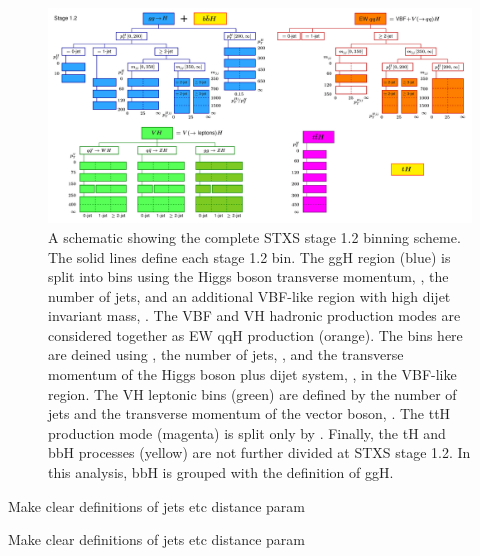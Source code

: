 \begin{landscape}
\begin{figure}[htbp]
  \centering
  \includegraphics[width=1\linewidth]{Figures/theory/stxs_schematic.pdf}
  \caption[STXS stage 1.2 binning scheme]
  {
    A schematic showing the complete STXS stage 1.2 binning scheme. The solid lines define each stage 1.2 bin. The ggH region (blue) is split into bins using the Higgs boson transverse momentum, \ptH, the number of jets, and an additional VBF-like region with high dijet invariant mass, \mjj. The VBF and VH hadronic production modes are considered together as EW qqH production (orange). The bins here are deined using \ptH, the number of jets, \mjj, and the transverse momentum of the Higgs boson plus dijet system, \ptHjj, in the VBF-like region. The VH leptonic bins (green) are defined by the number of jets and the transverse momentum of the vector boson, \ptV. The ttH production mode (magenta) is split only by \ptH. Finally, the tH and bbH processes (yellow) are not further divided at STXS stage 1.2. In this analysis, bbH is grouped with the definition of ggH.
  }
  \label{fig:stxs_schematic}
\end{figure}
\end{landscape}


\begin{table}[htb!]
    \caption[ggH STXS stage 1.2 definitions and fractions]{Make clear definitions of jets etc  distance param}
    \label{tab:ggH_definitions}
    \centering
    \scriptsize
    \renewcommand{\arraystretch}{1.2}
    \setlength{\tabcolsep}{5pt}
    \hspace*{-5cm}
    
    \hspace*{-5cm}
\end{table}

\begin{table}[htb!]
    \caption[qqH STXS stage 1.2 definitions and fractions]{Make clear definitions of jets etc distance param}
    \label{tab:qqH_definitions}
    \centering
    \scriptsize
    \renewcommand{\arraystretch}{1.2}
    \setlength{\tabcolsep}{5pt}
    \hspace*{-5cm}
    
    \hspace*{-5cm}
\end{table}


